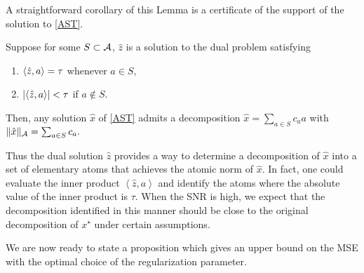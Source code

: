A straightforward corollary of this Lemma is
a certificate of the support of the solution to \eqref{AST}.

\begin{corollary}
\label{cor:dual-cert-support}

Suppose for some $S \subset \mathcal{A}$,  $\hat{z}$ is a solution to the dual problem  satisfying
\begin{enumerate}
\item $\langle\hat{z}, a\rangle = \tau$ whenever $a \in S,$
\item $|\langle\hat{z}, a\rangle| < \tau$ if $a \not\in S.$
\end{enumerate}
Then, any solution $\hat{x}$ of \eqref{AST} admits a decomposition $\hat{x} =
\sum_{a \in S}{c_a a}$ with $\lVert\hat{x}\rVert_{\mathcal{A}} = \sum_{a \in S}{c_a}.$

\end{corollary}


Thus the dual solution $\hat{z}$ provides a way to determine a
decomposition of $\hat{x}$ into a set of elementary atoms that achieves the
atomic norm of $\hat{x}$. In fact, one could evaluate the inner product
$\left<\hat{z}, a\right>$ and identify the atoms where the absolute value of the
inner product is $\tau$. When the SNR is high, we expect that the
decomposition identified in this manner should be close to the original
decomposition of $x^\star$ under certain assumptions.


We are now ready to state a proposition which gives an upper bound on the MSE
with the optimal choice of the regularization parameter.

